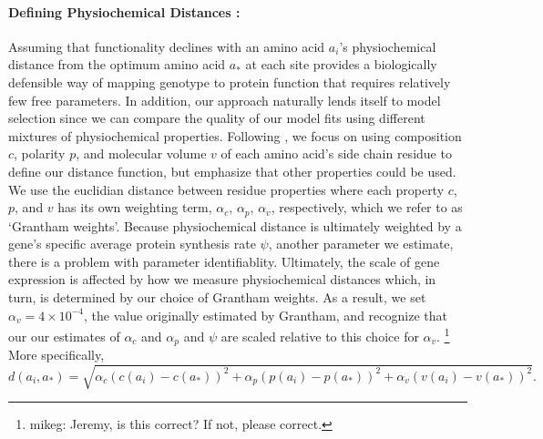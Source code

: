 \documentclass{article}
\newcommand{\alphac}{\ensuremath{\alpha_c}\xspace}
\newcommand{\alphap}{\ensuremath{\alpha_p}\xspace}
\newcommand{\alphav}{\ensuremath{\alpha_v}\xspace}
\newcommand{\aopt}{\ensuremath{a_*}\xspace}
\begin{document}
\paragraph*{Defining Physiochemical Distances :}
Assuming that functionality declines with an amino acid $a_i$'s physiochemical distance from the optimum amino acid \aopt at each site  provides a biologically defensible way of mapping genotype to protein function that requires relatively few free parameters.
In addition, our approach naturally lends itself to model selection since we can compare the quality of our model fits using different mixtures of physiochemical properties.
Following \citet{Grantham1974}, we focus on using composition $c$, polarity $p$, and molecular volume $v$ of each amino acid's side chain residue to define our distance function, but emphasize that other properties could be used.
We use the euclidian distance between residue properties where each property $c$, $p$, and $v$ has its own weighting term, $\alphac$, $\alphap$, $\alphav$, respectively, which we refer to as `Grantham weights'.
Because physiochemical distance is ultimately weighted by a gene's specific average protein synthesis rate $\psi$, another parameter we estimate, there is a problem with parameter identifiablity.
Ultimately, the scale of gene expression is affected by how we measure physiochemical distances which, in turn, is determined by our choice of Grantham weights.
As a result, we set $\alphav = 4 \times 10^{-4}$, the value originally estimated by Grantham, and recognize that our our estimates of $\alphac$ and $\alphap$ and $\psi$ are scaled relative to this choice for $\alphav$.
\footnote{mikeg: Jeremy, is this correct?  If not, please correct.}
More specifically,
\begin{equation*}
  d(a_i, \aopt) = \sqrt{\alphac \left(c\left(a_i\right) - c\left(\aopt\right)\right)^2 + \alphap \left(p\left(a_i\right) - p\left(\aopt\right)\right)^2 +  \alphav \left(v\left(a_i\right) - v\left(\aopt\right)\right)^2}.
\end{equation*}
\end{document}
